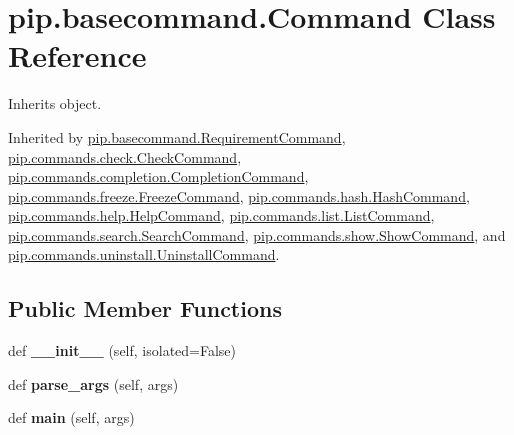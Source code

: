 \hypertarget{classpip_1_1basecommand_1_1_command}{}\section{pip.\+basecommand.\+Command Class Reference}
\label{classpip_1_1basecommand_1_1_command}


Inherits object.



Inherited by \hyperlink{classpip_1_1basecommand_1_1_requirement_command}{pip.\+basecommand.\+Requirement\+Command}, \hyperlink{classpip_1_1commands_1_1check_1_1_check_command}{pip.\+commands.\+check.\+Check\+Command}, \hyperlink{classpip_1_1commands_1_1completion_1_1_completion_command}{pip.\+commands.\+completion.\+Completion\+Command}, \hyperlink{classpip_1_1commands_1_1freeze_1_1_freeze_command}{pip.\+commands.\+freeze.\+Freeze\+Command}, \hyperlink{classpip_1_1commands_1_1hash_1_1_hash_command}{pip.\+commands.\+hash.\+Hash\+Command}, \hyperlink{classpip_1_1commands_1_1help_1_1_help_command}{pip.\+commands.\+help.\+Help\+Command}, \hyperlink{classpip_1_1commands_1_1list_1_1_list_command}{pip.\+commands.\+list.\+List\+Command}, \hyperlink{classpip_1_1commands_1_1search_1_1_search_command}{pip.\+commands.\+search.\+Search\+Command}, \hyperlink{classpip_1_1commands_1_1show_1_1_show_command}{pip.\+commands.\+show.\+Show\+Command}, and \hyperlink{classpip_1_1commands_1_1uninstall_1_1_uninstall_command}{pip.\+commands.\+uninstall.\+Uninstall\+Command}.

\subsection*{Public Member Functions}
\begin{DoxyCompactItemize}
\item 
\mbox{\label{classpip_1_1basecommand_1_1_command_a973004d1e8f1ca857c14201fb67fc5b3}} 
def {\bfseries \+\_\+\+\_\+init\+\_\+\+\_\+} (self, isolated=False)
\item 
\mbox{\label{classpip_1_1basecommand_1_1_command_ae757ceeeeaf9269c0bb25ffc8121abce}} 
def {\bfseries parse\+\_\+args} (self, args)
\item 
\mbox{\label{classpip_1_1basecommand_1_1_command_a30648efad3c3ced60168f12387cc4f7c}} 
def {\bfseries main} (self, args)
\end{DoxyCompactItemize}
